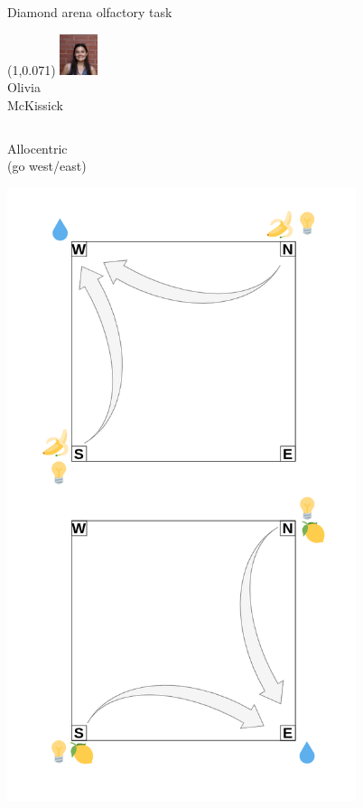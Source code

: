 \documentclass[bigger]{beamer}
\begin{document}
\begin{frame}[label={sec:org9f525ab}]{Diamond arena olfactory task}
\begin{textblock}{0.2}(1,0.071)%
\center%
\includegraphics[width=3em]{img/olivia.jpg}\\
\scriptsize
Olivia\\McKissick
\end{textblock}
\begin{columns}
\begin{column}[t]{0.5\columnwidth}
\center
\vspace{-2em}
Allocentric\\
(go west/east)
\vspace{-1.5em}
\begin{center}
\includegraphics[width=0.8\textwidth]{img/RL_env-allo-task.drawio.png}
\end{center}
\end{column}
\begin{column}[t]{0.5\columnwidth}
\end{column}
\end{columns}
\end{frame}
\end{document}
